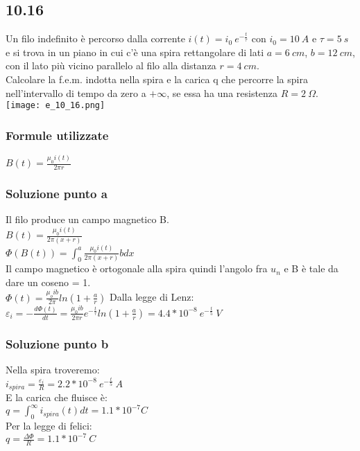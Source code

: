 \documentclass[../../main.tex]{subfiles}
\begin{document}
\subsection*{10.16}
Un filo indefinito è percorso dalla corrente $i(t) = i_0\ e^{-\frac{t}{\tau}}$ con $i_0 = 10\ A$ e $\tau = 5\ s$ e si trova in un piano in cui c'è una spira rettangolare di lati $a = 6\ cm$, $b = 12\ cm$, con il lato più vicino parallelo al filo alla distanza $r = 4\ cm$.\\
Calcolare la f.e.m. indotta nella spira e la carica q che percorre la spira nell'intervallo di tempo da zero a $+\infty$, se essa ha una resistenza $R = 2\ \Omega$.\\
\texttt{[image: e\_10\_16.png]}
\subsubsection*{Formule utilizzate}
$B(t) = \frac{\mu_0 i(t)}{2\pi r}$\\
\subsubsection*{Soluzione punto a}
Il filo produce un campo magnetico B.\\
$B(t) = \frac{\mu_0 i(t)}{2\pi (x + r)}$\\
$\Phi(B(t)) = \int_0^a \frac{\mu_0i(t)}{2\pi (x+r)}b dx$\\
Il campo magnetico è ortogonale alla spira quindi l'angolo fra $u_n$ e B è tale da dare un coseno = 1.\\
$\Phi(t) = \frac{\mu_o ib}{2\pi}ln\left(1+\frac{a}{r}\right)$
Dalla legge di Lenz:\\
$\varepsilon_i = -\frac{d\Phi(t)}{dt} = \frac{\mu_0 ib}{2\pi r} e^{-\frac{t}{\tau}}ln\left(1+\frac{a}{r}\right) = 4.4 * 10^{-8}\ e^{-\frac{t}{5}}\ V$
\subsubsection*{Soluzione punto b}
Nella spira troveremo:\\
$i_{spira} = \frac{\varepsilon_i}{R} = 2.2 * 10^{-8}\ e^{-\frac{t}{5}}\ A$\\
E la carica che fluisce è:\\
$q = \int_0^\infty i_{spira}(t)dt = 1.1*10^{-7}C$\\
Per la legge di felici:\\
$q = \frac{\Delta\Phi}{R} = 1.1 * 10^{-7}\ C$
\newpage
\end{document}
